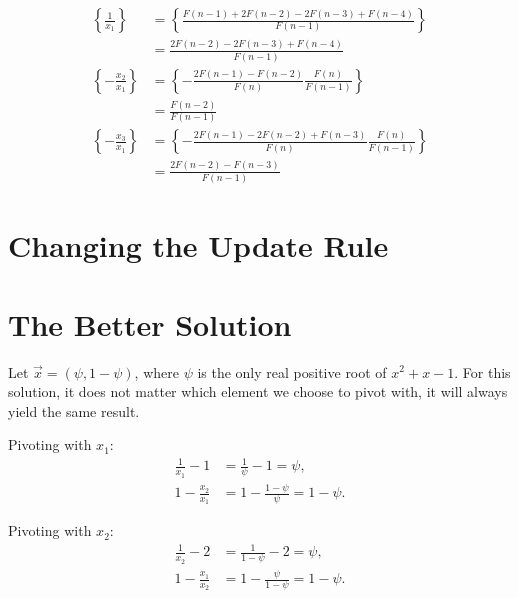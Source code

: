 \documentclass[english,version-2020-11]{uzl-thesis}
\begin{document}
\begin{example}
  \begin{align*}
    \left\{ \frac{1}{x_1} \right\}
    & = \left\{ \frac{F(n - 1) + 2 F(n - 2) - 2 F(n - 3) + F(n - 4)}{F(n - 1)} \right\} \\
    & = \frac{2 F(n - 2) - 2 F(n - 3) + F(n - 4)}{F(n - 1)} \\
    \left\{ -\frac{x_2}{x_1} \right\}
    & = \left\{ -\frac{2 F(n - 1) - F(n - 2)}{F(n)} \frac{F(n)}{F(n - 1)} \right\} \\
    & = \frac{F(n - 2)}{F(n - 1)} \\
    \left\{ -\frac{x_3}{x_1} \right\}
    & = \left\{ -\frac{2 F(n - 1) - 2 F(n - 2) + F(n - 3)}{F(n)} \frac{F(n)}{F(n - 1)} \right\} \\
    & = \frac{2 F(n - 2) - F(n - 3)}{F(n - 1)}
  \end{align*}
\end{example}

\section{Changing the Update Rule}


\section{The Better Solution}

Let $\vec x = (\psi, 1 - \psi)$, where $\psi$ is the only real positive root of $x^2 + x - 1$.
For this solution, it does not matter which element we choose to pivot with, it will always
yield the same result.

Pivoting with $x_1$:
\begin{align*}
  \frac{1}{x_1} - 1 & = \frac{1}{\psi} - 1 = \psi, \\
  1 - \frac{x_2}{x_1} & = 1 - \frac{1 - \psi}{\psi} = 1 - \psi.
\end{align*}

Pivoting with $x_2$:
\begin{align*}
  \frac{1}{x_2} - 2 & = \frac{1}{1 - \psi} - 2 = \psi, \\
  1 - \frac{x_1}{x_2} & = 1 - \frac{\psi}{1 - \psi} = 1 - \psi.
\end{align*}
\end{document}
